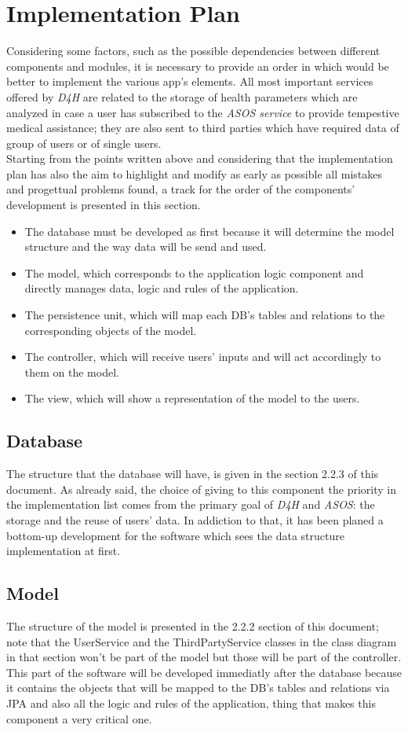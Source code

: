 \section{Implementation Plan}
Considering some factors, such as the possible dependencies between different components and modules, it is necessary to provide an order in which would be better to implement the various app's elements. All most important services offered by \textit{D4H} are related to the storage of health parameters which are analyzed in case a user has subscribed to the \textit{ASOS service} to provide tempestive medical assistance; they are also sent to third parties which have required data of group of users or of single users. \\
Starting from the points written above and considering that the implementation plan has also the aim to highlight and modify as early as possible all mistakes and progettual problems found, a track for the order of the components' development is presented in this section.

\begin{itemize}
	\item The database must be developed as first because it will determine the model structure and the way data will be send and used.
	\item The model, which corresponds to the application logic component and directly manages data, logic and rules of the application.
	\item The persistence unit, which will map each DB's tables and relations to the corresponding objects of the model. 
	\item The controller, which will receive users' inputs and will act accordingly to them on the model.
	\item The view, which will show a representation of the model to the users.
\end{itemize}
\subsection{Database}
	The structure that the database will have, is given in the section 2.2.3 of this document. As already said, the choice of giving to this component the priority in the implementation list comes 		from the primary goal of \textit{D4H} and \textit{ASOS}: the storage and the reuse of users' data. In addiction to that, it has been planed a bottom-up development for the software which 		sees the data structure implementation at first.
\subsection{Model}
	The structure of the model is presented in the 2.2.2 section of this document; note that the UserService and the ThirdPartyService classes in the class diagram in that section won't be part 		of the model but those will be part of the controller. This part of the software will be developed immediatly after the database because it contains the objects that will be mapped to the			DB's tables and relations via JPA and also all the logic and rules of the application, thing that makes this component a very critical one.
